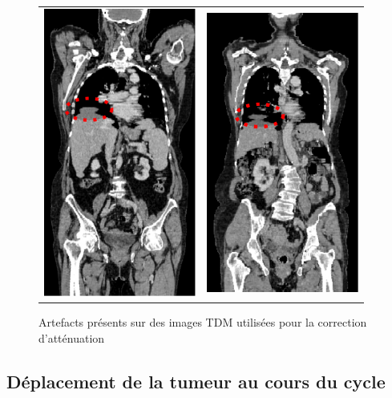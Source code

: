 \begin{figure}[h!]
	\begin{center}
		\begin{tabular}{c c}
			\includegraphics[width=5cm]{images/artefactCT1} & \includegraphics[width=5cm]{images/artefactCT2}
		\end{tabular}
	\end{center}
	\caption{Artefacts présents sur des images TDM utilisées pour la correction d'atténuation} 
	\label{fig:artefactsCT}
\end{figure}


\subsection{Déplacement de la tumeur au cours du cycle}

